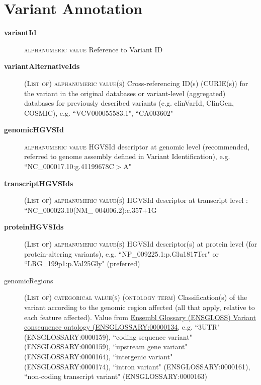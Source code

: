 \documentclass[a4paper, 10pt]{article}        %
\begin{document}
 
  \section*{ {\color{teal} Variant Annotation}}
  
  \begin{description}
	\item[\textbf{variantId}] {\textsc{alphanumeric value}} Reference to Variant ID 	\item[\textbf{variantAlternativeIds}] {\textsc{(List of) alphanumeric value(s)}} Cross-referencing ID(s) (CURIE(s)) for the variant in the original databases or variant-level (aggregated) databases for previously described variants (e.g. clinVarId, ClinGen, COSMIC), e.g. ``VCV000055583.1", ``CA003602"
	\item[\textbf{genomicHGVSId}]  {\textsc{alphanumeric value}} HGVSId descriptor at genomic level (recommended, referred to genome assembly defined in Variant Identification), e.g. ``NC\_000017.10:g.41199678C$>$A"
	\item[\textbf{transcriptHGVSIds}] {\textsc{(List of) alphanumeric value(s)}} HGVSId descriptor at transcript level : ``NC\_000023.10(NM\_ 004006.2):c.357+1G%
	\item[\textbf{proteinHGVSIds}] {\textsc{(List of) alphanumeric value(s)}} HGVSId descriptor(s) at protein level (for protein-altering variants), e.g. ``NP\_009225.1:p.Glu1817Ter" or ``LRG\_199p1:p.Val25Gly" (preferred)
	\item[genomicRegions] {\textsc{(List of) categorical value(s) (ontology term)}} Classification(s) of the variant according to the genomic region affected (all that apply, relative to each feature affected). Value from \href{http://ensembl.org/glossary/ENSGLOSSARY_0000134}{Ensembl Glossary (ENSGLOSS) Variant consequence ontology (ENSGLOSSARY:00000134}, e.g. ``3UTR" (ENSGLOSSARY:0000159), ``coding sequence variant" (ENSGLOSSARY:0000159), ``upstream gene variant" (ENSGLOSSARY:0000164), ``intergenic variant" (ENSGLOSSARY:0000174), ``intron variant" (ENSGLOSSARY:0000161), ``non-coding transcript variant" (ENSGLOSSARY:0000163)


\end{description}
\end{document}
